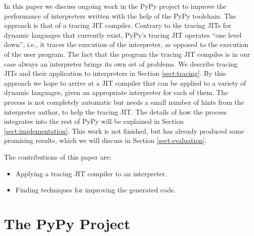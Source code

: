 \documentclass{sig-alternate}
\newcommand\ie{i.e.,\xspace}
\begin{document}
In this paper we discuss ongoing work in the PyPy project to improve the
performance of interpreters written with the help of the PyPy toolchain. The
approach is that of a tracing JIT compiler. Contrary to the tracing JITs for dynamic
languages that currently exist, PyPy's tracing JIT operates ``one level down'',
\ie it traces the execution of the interpreter, as opposed to the execution
of the user program. The fact that the program the tracing JIT compiles is
in our case always an interpreter brings its own set of problems. We describe
tracing JITs and their application to interpreters in Section
\ref{sect:tracing}.  By this approach we hope to arrive at a JIT compiler that can be
applied to a variety of dynamic languages, given an appropriate interpreter for each of them. The
process is not completely automatic but needs a small number of hints from the
interpreter author, to help the tracing JIT. The details of how the process
integrates into the rest of PyPy will be explained in Section
\ref{sect:implementation}. This work is not finished, but has already produced some
promising results, which we will discuss in Section \ref{sect:evaluation}.

The contributions of this paper are:
\begin{itemize}
\item Applying a tracing JIT compiler to an interpreter.
\item Finding techniques for improving the generated code.
\end{itemize}


%


\section{The PyPy Project}
\label{sect:pypy}
\end{document}
